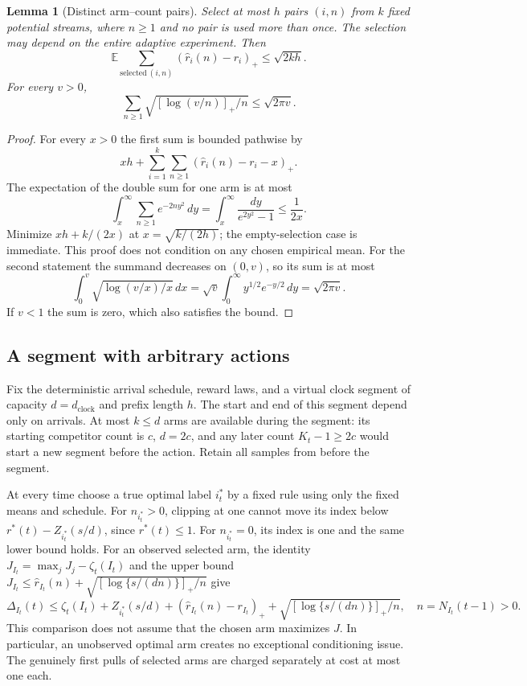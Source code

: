 \documentclass[11pt]{article}
\newtheorem{lemma}[theorem]{Lemma}
\theoremstyle{remark}
\newcommand{\E}{\mathbb E}
\begin{document}
\begin{lemma}[Distinct arm--count pairs]\label{lem:fccp-distinct}
Select at most $h$ pairs $(i,n)$ from $k$ fixed potential streams,
where $n\ge1$ and no pair is used more than once. The selection may
depend on the entire adaptive experiment. Then
\[
 \E\sum_{\mathrm{selected}\ (i,n)}
              (\hat r_i(n)-r_i)_+\le\sqrt{2kh}.
\]
For every $v>0$,
\[
 \sum_{n\ge1}\sqrt{[\log(v/n)]_+/n}\le\sqrt{2\pi v}.
\]
\end{lemma}
\begin{proof}
For every $x>0$ the first sum is bounded pathwise by
\[
 xh+\sum_{i=1}^k\sum_{n\ge1}(\hat r_i(n)-r_i-x)_+.
\]
The expectation of the double sum for one arm is at most
\[
 \int_x^\infty\sum_{n\ge1}e^{-2ny^2}\,dy
 =\int_x^\infty\frac{dy}{e^{2y^2}-1}\le\frac1{2x}.
\]
Minimize $xh+k/(2x)$ at $x=\sqrt{k/(2h)}$; the empty-selection case
is immediate. This proof does not condition on any chosen empirical
mean. For the second statement the summand decreases on $(0,v)$, so
its sum is at most
\[
 \int_0^v\sqrt{\log(v/x)/x}\,dx
 =\sqrt v\int_0^\infty y^{1/2}e^{-y/2}\,dy
 =\sqrt{2\pi v}.
\]
If $v<1$ the sum is zero, which also satisfies the bound.
\end{proof}

\subsection{A segment with arbitrary actions}
Fix the deterministic arrival schedule, reward laws, and a virtual
clock segment of capacity $d=d_{\mathrm{clock}}$ and prefix length
$h$. The start and end of this segment depend only on arrivals.
At most $k\le d$ arms are available during the segment: its starting
competitor count is $c$, $d=2c$, and any later count $K_t-1\ge2c$
would start a new segment before the action. Retain all samples from
before the segment.

At every time choose a true optimal label $i_t^*$ by a fixed rule using
only the fixed means and schedule. For $n_{i_t^*}>0$, clipping at one
cannot move its index below
$r^*(t)-Z_{i_t^*}(s/d)$, since $r^*(t)\le1$.
For $n_{i_t^*}=0$, its index is one and the same lower bound holds.
For an observed selected arm, the identity
$J_{I_t}=\max_jJ_j-\zeta_t(I_t)$ and the upper bound
$J_{I_t}\le\hat r_{I_t}(n)+\sqrt{[\log\{s/(dn)\}]_+/n}$ give
\begin{equation}\label{eq:fccp-arbitrary-decomposition}
 \Delta_{I_t}(t)\le\zeta_t(I_t)+Z_{i_t^*}(s/d)
       +(\hat r_{I_t}(n)-r_{I_t})_+
       +\sqrt{[\log\{s/(dn)\}]_+/n},\quad n=N_{I_t}(t-1)>0.
\end{equation}
This comparison does not assume that the chosen arm maximizes $J$.
In particular, an unobserved optimal arm creates no exceptional
conditioning issue. The genuinely first pulls of selected arms are
charged separately at cost at most one each.
\end{document}
